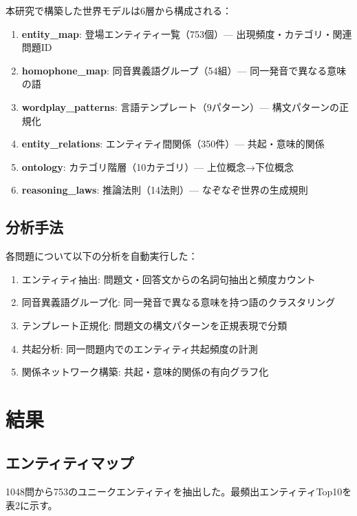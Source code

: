 \documentclass[a4paper,11pt]{ltjsarticle}
\begin{document}
本研究で構築した世界モデルは6層から構成される：

\begin{enumerate}
    \item \textbf{entity\_map}: 登場エンティティ一覧（753個）— 出現頻度・カテゴリ・関連問題ID
    \item \textbf{homophone\_map}: 同音異義語グループ（54組）— 同一発音で異なる意味の語
    \item \textbf{wordplay\_patterns}: 言語テンプレート（9パターン）— 構文パターンの正規化
    \item \textbf{entity\_relations}: エンティティ間関係（350件）— 共起・意味的関係
    \item \textbf{ontology}: カテゴリ階層（10カテゴリ）— 上位概念→下位概念
    \item \textbf{reasoning\_laws}: 推論法則（14法則）— なぞなぞ世界の生成規則
\end{enumerate}

\subsection{分析手法}

各問題について以下の分析を自動実行した：

\begin{enumerate}
    \item エンティティ抽出: 問題文・回答文からの名詞句抽出と頻度カウント
    \item 同音異義語グループ化: 同一発音で異なる意味を持つ語のクラスタリング
    \item テンプレート正規化: 問題文の構文パターンを正規表現で分類
    \item 共起分析: 同一問題内でのエンティティ共起頻度の計測
    \item 関係ネットワーク構築: 共起・意味的関係の有向グラフ化
\end{enumerate}

\section{結果}

\subsection{エンティティマップ}

1048問から753のユニークエンティティを抽出した。最頻出エンティティTop10を表2に示す。
\end{document}
